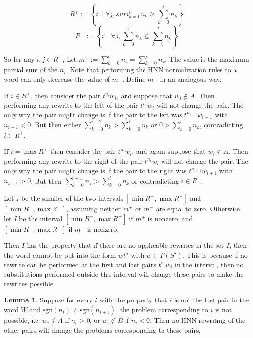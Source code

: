 \documentclass[12pt]{article} %
\theoremstyle{definition}
\theoremstyle{definition}
\theoremstyle{definition}
\newtheorem{lemma}[thm]{Lemma}
\theoremstyle{definition}
\begin{document}
\begin{equation}
    R^{+} := \left\{ i \ \mid \forall j, sum_{k=0}^i n_k \ge \sum_{k=0}^j n_k\right\}
\end{equation}
\begin{equation}
    R^{-} := \left\{ i \ \mid \forall j, \sum_{k=0}^i n_k \le \sum_{k=0}^j n_k \right\}
\end{equation}

So for any $i, j \in R^{+}$, Let $m^{+} :=
\sum_{k=0}^i n_k = \sum_{k=0}^j n_k$. The value
is the maximum partial sum of the $n_i$. Note that performing the HNN
normalization rules to a word can only decrease the value of $m^{+}$.
Define $m^{-}$ in an analogous way.

If $i \in R^{+}$, then consider the pair $t^{n_i}w_i$, and suppose that
$\overline{w_i} \notin A$. Then performing any rewrite to the left of the
pair $t^{n_i}w_i$ will not change the pair. The only way the pair might change
is if the pair to the left was $t^{n_{i-1}}w_{i-1}$ with $n_{i-1} < 0$.
But then either $\sum_{k=0}^{i-2} n_k > \sum_{k=0}^i n_k$ or $0 > \sum_{k=0}^i n_k$,
contradicting $i \in R^{+}$.

If $i = \max R^{+}$ then consider the pair $t^{n_i}w_i$, and again suppose that
$\overline{w_i} \notin A$. Then performing any rewrite to the right of the
pair $t^{n_i}w_i$ will not change the pair. The only way the pair might change
is if the pair to the right was $t^{n_{i+1}}w_{i+1}$ with $n_{i-1} > 0$.
But then $\sum_{k=0}^{i+1} n_k > \sum_{k=0}^i n_k$ or contradicting $i \in R^{+}$.

Let $I$ be the smaller of the two intervals $[\min R^+, \max R^+]$ and
$[\min R^{-}, \max R^-]$, assuming neither $m^+$ or $m^-$ are equal to zero.
Otherwise let $I$ be the interval $[\min R^+, \max R^+]$ if $m^+$ is nonzero,
and $[\min R^-, \max R^-]$ if $m^-$ is nonzero.

Then $I$ has the property that if there are no applicable rewrites
in the set $I$, then the word cannot be put into the form $wt^n$ with $w \in F(S')$.
This is because if no rewrite can be performed
at the first and last pairs $t^{n_i}w_i$
in the interval, then no substitutions performed outside this interval will
change these pairs to make the rewrites possible.

\begin{lemma}\label{signseq}
Suppose for every $i$ with the property that $i$ is not
the last pair in the word $W$ and $\text{sgn}(n_i) \ne \text{sgn}(n_{i+1})$,
the problem corresponding to $i$ is not possible, i.e. $\overline{w_i} \notin \overline{A}$
if $n_i > 0$, or $\overline{w_i}
\notin \overline{B}$ if $n_i < 0$. Then no HNN rewriting of the other pairs will
change the problems corresponding to these pairs.
\end{lemma}
\end{document}
